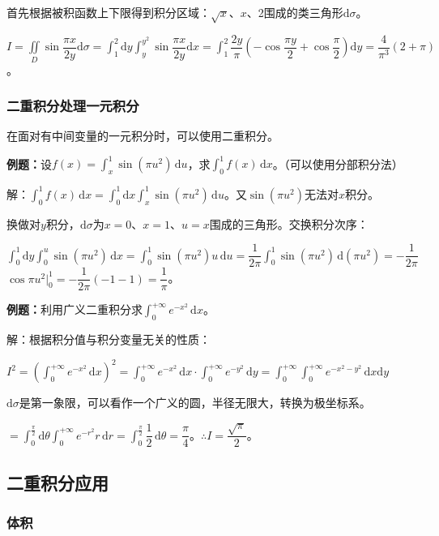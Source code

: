 \documentclass[UTF8, 12pt]{ctexart}
\begin{document}
首先根据被积函数上下限得到积分区域：$\sqrt{x}$、$x$、2围成的类三角形$\textrm{d}\sigma$。

$I=\displaystyle{\iint\limits_D\sin\dfrac{\pi x}{2y}\textrm{d}\sigma}=\displaystyle{\int_1^2\textrm{d}y\int_y^{y^2}\sin\dfrac{\pi x}{2y}\textrm{d}x}=\displaystyle{\int_1^2\dfrac{2y}{\pi}\left(-\cos\dfrac{\pi y}{2}+\cos\dfrac{\pi}{2}\right)}\textrm{d}y=\dfrac{4}{\pi^3}(2+\pi)$。

\subsubsection{二重积分处理一元积分}

在面对有中间变量的一元积分时，可以使用二重积分。

\textbf{例题：}设$f(x)=\int_x^1\sin(\pi u^2)\,\textrm{d}u$，求$\int_0^1f(x)\,\textrm{d}x$。（可以使用分部积分法）

解：$\int_0^1f(x)\,\textrm{d}x=\int_0^1\textrm{d}x\int_x^1\sin(\pi u^2)\,\textrm{d}u$。又$\sin(\pi u^2)$无法对$x$积分。

换做对$y$积分，$\textrm{d}\sigma$为$x=0$、$x=1$、$u=x$围成的三角形。交换积分次序：

$\int_0^1\textrm{d}y\int_0^u\sin(\pi u^2)\,\textrm{d}x=\int_0^1\sin(\pi u^2)u\,\textrm{d}u=\dfrac{1}{2\pi}\int_0^1\sin(\pi u^2)\,\textrm{d}(\pi u^2)=-\dfrac{1}{2\pi}$\\$\cos\pi u^2|_0^1=-\dfrac{1}{2\pi}(-1-1)=\dfrac{1}{\pi}$。

\textbf{例题：}利用广义二重积分求$\int_0^{+\infty}e^{-x^2}\,\textrm{d}x$。

解：根据积分值与积分变量无关的性质：

$I^2=(\int_0^{+\infty}e^{-x^2}\,\textrm{d}x)^2=\int_0^{+\infty}e^{-x^2}\,\textrm{d}x\cdot\int_0^{+\infty}e^{-y^2}\,\textrm{d}y=\int_0^{+\infty}\int_0^{+\infty}e^{-x^2-y^2}\,\textrm{d}x\textrm{d}y$

$\textrm{d}\sigma$是第一象限，可以看作一个广义的圆，半径无限大，转换为极坐标系。

$=\int_0^\frac{\pi}{2}\textrm{d}\theta\int_0^{+\infty}e^{-r^2}r\,\textrm{d}r=\displaystyle{\int_0^\frac{\pi}{2}\dfrac{1}{2}\,\textrm{d}\theta}=\dfrac{\pi}{4}$。$\therefore I=\dfrac{\sqrt{\pi}}{2}$。

\subsection{二重积分应用}

\subsubsection{体积}
\end{document}
